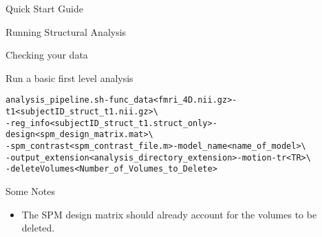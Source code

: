 \documentclass[]{report}
\begin{document}
\begin{chapter}{Quick Start Guide }
\begin{section}{Running Structural Analysis}
\begin{subsection}{Checking your data}
\end{subsection}

\end{section}

\begin{section}{Run a basic first level analysis}
\
\begin{alltt}
analysis\_pipeline.sh  -func\_data <fmri\_4D.nii.gz>   -t1 <subjectID\_struct\_t1.nii.gz>  \textbackslash \\
\hspace*{0.5in} -reg\_info <subjectID\_struct\_t1.struct\_only> -design <spm\_design\_matrix.mat> \textbackslash  \\
\hspace*{0.5in} -spm\_contrast  <spm\_contrast\_file.m> -model\_name <name\_of\_model> \textbackslash   \\
\hspace*{0.5in} -output\_extension <analysis\_directory\_extension>  -motion -tr <TR> \textbackslash  \\
\hspace*{0.5in} -deleteVolumes <Number\_of\_Volumes\_to\_Delete>
\end{alltt}
{Some Notes}
\begin{itemize}
	\item  The SPM design matrix should already account for the volumes to be deleted.
\end{itemize}

\end{section}



\end{chapter}
\end{document}
